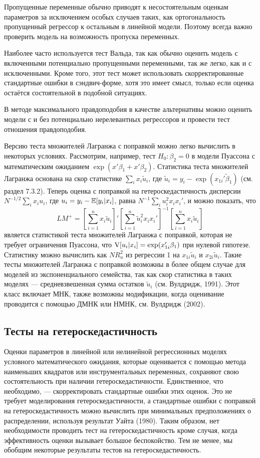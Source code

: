 Пропущенные переменные обычно приводят к несостоятельным оценкам параметров за исключением особых случаев таких, как ортогональность пропущенный регрессор к остальным в линейной модели. Поэтому всегда важно проверить модель на возможность пропуска переменных.

Наиболее часто используется тест Вальда, так как обычно оценить модель с  включенными потенциально пропущенными переменными, так же легко, как и с исключенными. Кроме того, этот тест может использовать скорректированные  стандартные ошибки в сэндвич-форме, хотя это имеет смысл, только если оценка остаётся состоятельной в подобной ситуациях.

В методе максимального правдоподобия в качестве альтернативы можно оценить модели с и без потенциально нерелевантных регрессоров и провести тест отношения правдоподобия.

Версию теста множителей Лагранжа с поправкой можно легко вычислить в некоторых условиях. Рассмотрим, например, тест $H_0: \beta_2 = 0$ в модели Пуассона с математическим ожиданием $\exp(x'\beta_1 + x'\beta_2)$. Статистика теста множителей Лагранжа основана на скор статистике $\sum_i x_i\tilde{u}_i$, где $\tilde{u}_i = y_i - \exp(x_{1i}'\tilde{\beta}_1)$ (см. раздел 7.3.2). Теперь оценка с поправкой на гетероскедастичность дисперсии $N^{-1/2}\sum_i x_iu_i$, где $u_i = y_i - \mathbb{E}[y_i|x_i]$, равна $N^{-1}\sum_i u_i^2x_ix_i'$, и можно показать, что
\[
LM^+ = \left[ \sum_{i=1}^n x_i\tilde{u}_i \right]' \left[\sum_{i=1}^n \tilde{u}_i^2x_ix_i'\right]^{-1} \left[ \sum_{i=1}^n x_i\tilde{u}_i\right]
\]
является статистикой  теста множителей Лагранжа с поправкой, которая не требует ограничения Пуассона, что $\mathrm{V}[u_i|x_i] = \exp(x_{1i}'\beta_1)$ при нулевой гипотезе. Статистику можно вычислить как $NR_u^2$ из регрессии 1 на $x_{1i}\tilde{u}_i$ и $x_{2i}\tilde{u}_i$. Такие тесты множителей Лагранжа с поправкой возможны в более общем случае для моделей из  экспоненциального семейства, так как скор статистика в таких моделях --- средневзвешенная сумма остатков $\tilde{u}_i$ (см. Вулдридж, 1991). Этот класс включает МНК, также возможны модификации, когда оценивание проводится с помощью ДМНК или НМНК, см. Вулдридж (2002).

\subsection{Тесты на гетероскедастичность}

Оценки параметров в линейной или нелинейной регрессионных моделях условного математического ожидания, которые оценивается с помощью метода наименьших квадратов или инструментальных переменных, сохраняют свою состоятельность при наличии гетероскедастичности. Единственное, что необходимо, --- скорректировать стандартные ошибки этих оценок. Это не требует моделирования гетероскедастичности, а стандартные ошибки с поправкой на гетероскедастичность можно вычислить при минимальных предположениях о распределении, используя результат Уайта (1980). Таким образом, нет необходимости проводить тест на гетероскедастичность кроме случая, когда эффективность оценки вызывает большое беспокойство. Тем не менее, мы обобщим некоторые результаты тестов на гетероскедастичность.

